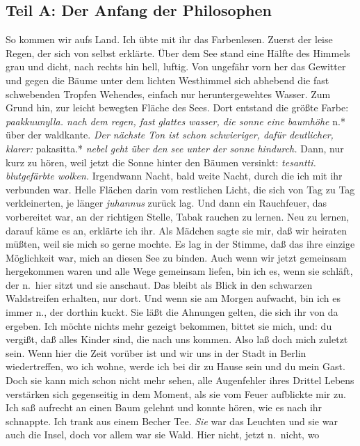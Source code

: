 \documentclass[
]{article}
\author{}
\date{\vspace{-2.5em}}
\begin{document}
\subsection{Teil A: Der Anfang der
Philosophen}\label{teil-a-der-anfang-der-philosophen}

So kommen wir aufs Land. Ich übte mit ihr das Farbenlesen. Zuerst der
leise Regen, der sich von selbst erklärte. Über dem See stand eine
Hälfte des Himmels grau und dicht, nach rechts hin hell, luftig. Von
ungefähr vorn her das Gewitter und gegen die Bäume unter dem lichten
Westhimmel sich abhebend die fast schwebenden Tropfen Wehendes, einfach
nur heruntergewehtes Wasser. Zum Grund hin, zur leicht bewegten Fläche
des Sees. Dort entstand die größte Farbe: \emph{paakkuunylla. nach dem
regen, fast glattes wasser, die sonne eine baumhöhe }n.* über der
waldkante. \emph{Der nächste Ton ist schon schwieriger, dafür
deutlicher, klarer: }pakasitta.* \emph{nebel geht über den see unter der
sonne hindurch. }Dann, nur kurz zu hören, weil jetzt die Sonne hinter
den Bäumen versinkt: \emph{tesantti. blutgefärbte wolken. }Irgendwann
Nacht, bald weite Nacht, durch die ich mit ihr verbunden war. Helle
Flächen darin vom restlichen Licht, die sich von Tag zu Tag
verkleinerten, je länger \emph{juhannus} zurück lag. Und dann ein
Rauchfeuer, das vorbereitet war, an der richtigen Stelle, Tabak rauchen
zu lernen. Neu zu lernen, darauf käme es an, erklärte ich ihr. Als
Mädchen sagte sie mir, daß wir heiraten müßten, weil sie mich so gerne
mochte. Es lag in der Stimme, daß das ihre einzige Möglichkeit war, mich
an diesen See zu binden. Auch wenn wir jetzt gemeinsam hergekommen waren
und alle Wege gemeinsam liefen, bin ich es, wenn sie schläft, der
n.~hier sitzt und sie anschaut. Das bleibt als Blick in den schwarzen
Waldstreifen erhalten, nur dort. Und wenn sie am Morgen aufwacht, bin
ich es immer n., der dorthin kuckt. Sie läßt die Ahnungen gelten, die
sich ihr von da ergeben. Ich möchte nichts mehr gezeigt bekommen, bittet
sie mich, und: du vergißt, daß alles Kinder sind, die nach uns kommen.
Also laß doch mich zuletzt sein. Wenn hier die Zeit vorüber ist und wir
uns in der Stadt in Berlin wiedertreffen, wo ich wohne, werde ich bei
dir zu Hause sein und du mein Gast. Doch sie kann mich schon nicht mehr
sehen, alle Augenfehler ihres Drittel Lebens verstärken sich gegenseitig
in dem Moment, als sie vom Feuer aufblickte mir zu. Ich saß aufrecht an
einen Baum gelehnt und konnte hören, wie es nach ihr schnappte. Ich
trank aus einem Becher Tee. \emph{Sie} war das Leuchten und sie war auch
die Insel, doch vor allem war sie Wald. Hier nicht, jetzt n.~nicht, wo
\end{document}
